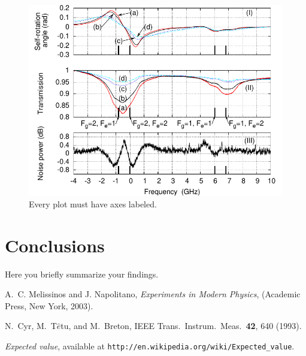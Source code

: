 \documentclass[letterpaper,12pt]{article}
\begin{document}
\begin{figure}[ht] 
  \centering
      \includegraphics[width=0.5\columnwidth]{sr_squeezing_vs_detuning}

        \caption{
                \label{fig:exp_plots}  
                Every plot must have axes labeled.
        }
\end{figure}


\section{Conclusions}
Here you briefly summarize your findings.


\begin{thebibliography}{99}

A.~C. Melissinos and J. Napolitano, \textit{Experiments in Modern Physics},
(Academic Press, New York, 2003).

N.\ Cyr, M.\ T$\hat{e}$tu, and M.\ Breton,
IEEE Trans.\ Instrum.\ Meas.\ \textbf{42}, 640 (1993).

 \emph{Expected value},  available at
\texttt{http://en.wikipedia.org/wiki/Expected\_value}.

\end{thebibliography}
\end{document}
